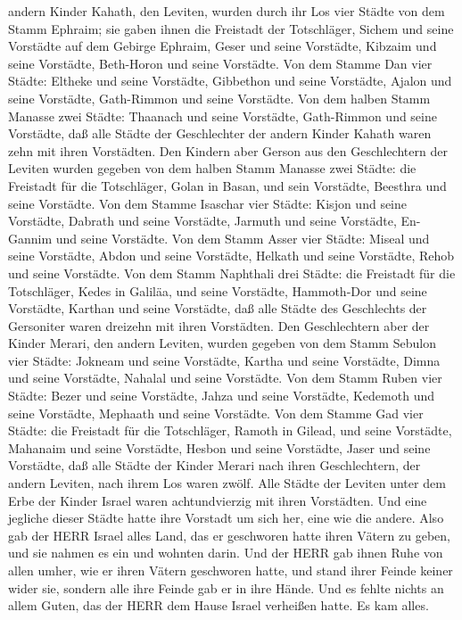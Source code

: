 andern Kinder Kahath, den Leviten, wurden durch ihr Los vier Städte von
dem Stamm Ephraim;  sie gaben ihnen die Freistadt der
Totschläger, Sichem und seine Vorstädte auf dem Gebirge Ephraim, Geser
und seine Vorstädte,  Kibzaim und seine Vorstädte,
Beth-Horon und seine Vorstädte.  Von dem Stamme Dan vier
Städte: Eltheke und seine Vorstädte, Gibbethon und seine Vorstädte,
 Ajalon und seine Vorstädte, Gath-Rimmon und seine
Vorstädte.  Von dem halben Stamm Manasse zwei Städte:
Thaanach und seine Vorstädte, Gath-Rimmon und seine Vorstädte,
 daß alle Städte der Geschlechter der andern Kinder Kahath
waren zehn mit ihren Vorstädten.  Den Kindern aber Gerson
aus den Geschlechtern der Leviten wurden gegeben von dem halben Stamm
Manasse zwei Städte: die Freistadt für die Totschläger, Golan in Basan,
und sein Vorstädte, Beesthra und seine Vorstädte.  Von dem
Stamme Isaschar vier Städte: Kisjon und seine Vorstädte, Dabrath und
seine Vorstädte,  Jarmuth und seine Vorstädte, En-Gannim
und seine Vorstädte.  Von dem Stamm Asser vier Städte:
Miseal und seine Vorstädte, Abdon und seine Vorstädte, 
Helkath und seine Vorstädte, Rehob und seine Vorstädte. 
Von dem Stamm Naphthali drei Städte: die Freistadt für die Totschläger,
Kedes in Galiläa, und seine Vorstädte, Hammoth-Dor und seine Vorstädte,
Karthan und seine Vorstädte,  daß alle Städte des
Geschlechts der Gersoniter waren dreizehn mit ihren Vorstädten.
 Den Geschlechtern aber der Kinder Merari, den andern
Leviten, wurden gegeben von dem Stamm Sebulon vier Städte: Jokneam und
seine Vorstädte, Kartha und seine Vorstädte,  Dimna und
seine Vorstädte, Nahalal und seine Vorstädte.  Von dem
Stamm Ruben vier Städte: Bezer und seine Vorstädte, Jahza und seine
Vorstädte,  Kedemoth und seine Vorstädte, Mephaath und
seine Vorstädte.  Von dem Stamme Gad vier Städte: die
Freistadt für die Totschläger, Ramoth in Gilead, und seine Vorstädte,
 Mahanaim und seine Vorstädte, Hesbon und seine Vorstädte,
Jaser und seine Vorstädte,  daß alle Städte der Kinder
Merari nach ihren Geschlechtern, der andern Leviten, nach ihrem Los
waren zwölf.  Alle Städte der Leviten unter dem Erbe der
Kinder Israel waren achtundvierzig mit ihren Vorstädten. 
Und eine jegliche dieser Städte hatte ihre Vorstadt um sich her, eine
wie die andere.  Also gab der HERR Israel alles Land, das
er geschworen hatte ihren Vätern zu geben, und sie nahmen es ein und
wohnten darin.  Und der HERR gab ihnen Ruhe von allen
umher, wie er ihren Vätern geschworen hatte, und stand ihrer Feinde
keiner wider sie, sondern alle ihre Feinde gab er in ihre Hände.
 Und es fehlte nichts an allem Guten, das der HERR dem
Hause Israel verheißen hatte. Es kam alles.

